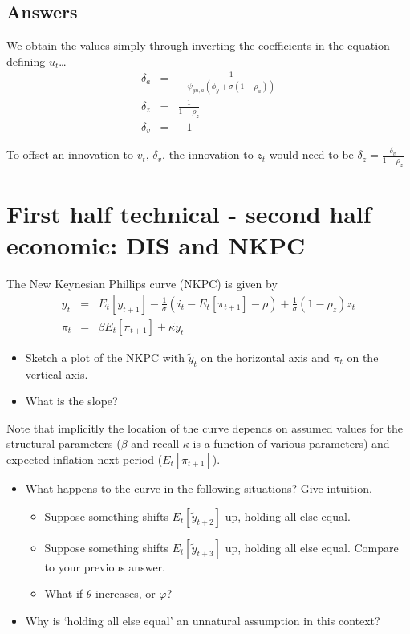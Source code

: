 \documentclass[authoryear,11pt]{elsarticle}
\begin{document}
\subsection*{Answers}
We obtain the values simply through inverting the coefficients in the equation defining $u_{t}$\ldots
\begin{eqnarray*}
\delta_{a} &=& -\frac{1}{\psi_{yn,a}\left( \phi_{y} + \sigma(1-\rho_{a}) \right)} \\
\delta_{z} &=& \frac{1}{1-\rho_{z}} \\
\delta_{v} &=& -1
\end{eqnarray*}

To offset an innovation to $v_{t}$, $\delta_{v}$, the innovation to $z_{t}$ would need to be $\delta_{z} = \frac{\delta_{v}}{1-\rho_{z}}$

\section{First half technical - second half economic: DIS and NKPC}
The New Keynesian Phillips curve (NKPC) is given by
\begin{eqnarray*}
y_{t} &=& E_{t}[y_{t+1}] - \frac{1}{\sigma}(i_{t} - E_{t}[\pi_{t+1}] - \rho) + \frac{1}{\sigma}(1-\rho_{z})z_{t} \\
\pi_{t} &=& \beta E_{t}[ \pi_{t+1} ] + \kappa \tilde{y}_{t}
\end{eqnarray*}

\begin{itemize}
\item	Sketch a plot of the NKPC with $\tilde{y}_{t}$ on the horizontal axis and $\pi_{t}$ on the vertical axis.
\item	What is the slope?
\end{itemize}
Note that implicitly the location of the curve depends on assumed values for the structural parameters ($\beta$ and recall $\kappa$ is a function of various parameters) and expected inflation next period ($E_{t}[\pi_{t+1}]$).
\begin{itemize}
\item	What happens to the curve in the following situations? Give intuition.
	\begin{itemize}
	\item	Suppose something shifts $E_{t}[\tilde{y}_{t+2}]$ up, holding all else equal.
	\item	Suppose something shifts $E_{t}[\tilde{y}_{t+3}]$ up, holding all else equal. Compare to your previous answer.
	\item	What if $\theta$ increases, or $\varphi$?
	\end{itemize}
\item	Why is `holding all else equal' an unnatural assumption in this context?
\end{itemize}
\end{document}
